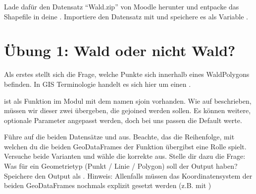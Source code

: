 \documentclass[letterpaper,10pt,english]{sphinxmanual}
\begin{document}
Lade dafür den Datensatz “Wald.zip” von Moodle herunter und entpacke das Shapefile in deine . Importiere den Datensatz mit  und speichere es als Variable .

\begin{sphinxVerbatim}[commandchars=\\\{\}]
   
   

  


  
  
\end{sphinxVerbatim}


\section{Übung 1: Wald oder nicht Wald?}
\label{\detokenize{03_04_Waldanteil_Berechnen:ubung-1-wald-oder-nicht-wald}}
Als erstes stellt sich die Frage, welche Punkte sich innerhalb eines Wald\sphinxhyphen{}Polygons befinden. In GIS Terminologie handelt es sich hier um einen .

 ist als Funktion im Modul  mit dem namen sjoin vorhanden. Wie auf  beschrieben, müssen wir dieser  zwei  übergeben, die ge\sphinxhyphen{}joined werden sollen. Es können weitere, optionale Parameter angepasst werden, doch bei uns passen die Default werte.

Führe  auf die beiden Datensätze  und  aus. Beachte, das die Reihenfolge, mit welchen du die beiden GeoDataFrames der Funktion übergibst eine Rolle spielt. Versuche beide Varianten und wähle die korrekte aus. Stelle dir dazu die Frage: Was für ein Geometrietyp (Punkt / Linie / Polygon) soll der Output haben? Speichere den Output als .
Hinweis: Allenfalls müssen das Koordinatensystem der beiden GeoDataFrames nochmals explizit gesetzt werden (z.B. mit )
\end{document}
